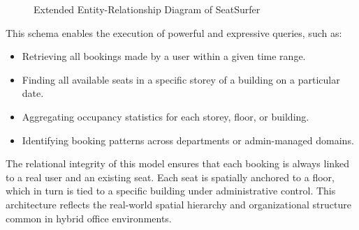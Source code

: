 \documentclass[12pt,a4paper]{report}
\begin{document}
\begin{figure}[H]
    \centering
    \caption{Extended Entity-Relationship Diagram of SeatSurfer}
    \label{fig:erd}
\end{figure}

This schema enables the execution of powerful and expressive queries, such as:
\begin{itemize}
    \item Retrieving all bookings made by a user within a given time range.
    \item Finding all available seats in a specific storey of a building on a particular date.
    \item Aggregating occupancy statistics for each storey, floor, or building.
    \item Identifying booking patterns across departments or admin-managed domains.
\end{itemize}

The relational integrity of this model ensures that each booking is always linked to a real user and an existing seat. Each seat is spatially anchored to a floor, which in turn is tied to a specific building under administrative control. This architecture reflects the real-world spatial hierarchy and organizational structure common in hybrid office environments.
\end{document}
